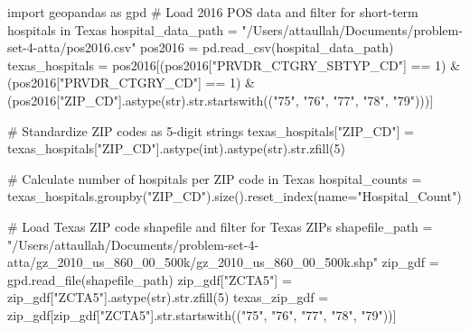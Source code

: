 \documentclass[
  letterpaper,
  DIV=11,
  numbers=noendperiod]{scrartcl}
\newenvironment{Shaded}{\begin{snugshade}}{\end{snugshade}}
\newcommand{\BuiltInTok}[1]{\textcolor[rgb]{0.00,0.23,0.31}{#1}}
\newcommand{\CommentTok}[1]{\textcolor[rgb]{0.37,0.37,0.37}{#1}}
\newcommand{\DecValTok}[1]{\textcolor[rgb]{0.68,0.00,0.00}{#1}}
\newcommand{\ImportTok}[1]{\textcolor[rgb]{0.00,0.46,0.62}{#1}}
\newcommand{\NormalTok}[1]{\textcolor[rgb]{0.00,0.23,0.31}{#1}}
\newcommand{\OperatorTok}[1]{\textcolor[rgb]{0.37,0.37,0.37}{#1}}
\newcommand{\StringTok}[1]{\textcolor[rgb]{0.13,0.47,0.30}{#1}}
\begin{document}
\begin{Shaded}
\begin{Highlighting}[]
\ImportTok{import}\NormalTok{ geopandas }\ImportTok{as}\NormalTok{ gpd}
\CommentTok{\# Load 2016 POS data and filter for short{-}term hospitals in Texas}
\NormalTok{hospital\_data\_path }\OperatorTok{=} \StringTok{"/Users/attaullah/Documents/problem{-}set{-}4{-}atta/pos2016.csv"}
\NormalTok{pos2016 }\OperatorTok{=}\NormalTok{ pd.read\_csv(hospital\_data\_path)}
\NormalTok{texas\_hospitals }\OperatorTok{=}\NormalTok{ pos2016[(pos2016[}\StringTok{"PRVDR\_CTGRY\_SBTYP\_CD"}\NormalTok{] }\OperatorTok{==} \DecValTok{1}\NormalTok{) }\OperatorTok{\&}
\NormalTok{                          (pos2016[}\StringTok{"PRVDR\_CTGRY\_CD"}\NormalTok{] }\OperatorTok{==} \DecValTok{1}\NormalTok{) }\OperatorTok{\&}
\NormalTok{                          (pos2016[}\StringTok{"ZIP\_CD"}\NormalTok{].astype(}\BuiltInTok{str}\NormalTok{).}\BuiltInTok{str}\NormalTok{.startswith((}\StringTok{"75"}\NormalTok{, }\StringTok{"76"}\NormalTok{, }\StringTok{"77"}\NormalTok{, }\StringTok{"78"}\NormalTok{, }\StringTok{"79"}\NormalTok{)))]}

\CommentTok{\# Standardize ZIP codes as 5{-}digit strings}
\NormalTok{texas\_hospitals[}\StringTok{"ZIP\_CD"}\NormalTok{] }\OperatorTok{=}\NormalTok{ texas\_hospitals[}\StringTok{"ZIP\_CD"}\NormalTok{].astype(}\BuiltInTok{int}\NormalTok{).astype(}\BuiltInTok{str}\NormalTok{).}\BuiltInTok{str}\NormalTok{.zfill(}\DecValTok{5}\NormalTok{)}

\CommentTok{\# Calculate number of hospitals per ZIP code in Texas}
\NormalTok{hospital\_counts }\OperatorTok{=}\NormalTok{ texas\_hospitals.groupby(}\StringTok{"ZIP\_CD"}\NormalTok{).size().reset\_index(name}\OperatorTok{=}\StringTok{"Hospital\_Count"}\NormalTok{)}

\CommentTok{\# Load Texas ZIP code shapefile and filter for Texas ZIPs}
\NormalTok{shapefile\_path }\OperatorTok{=} \StringTok{"/Users/attaullah/Documents/problem{-}set{-}4{-}atta/gz\_2010\_us\_860\_00\_500k/gz\_2010\_us\_860\_00\_500k.shp"}
\NormalTok{zip\_gdf }\OperatorTok{=}\NormalTok{ gpd.read\_file(shapefile\_path)}
\NormalTok{zip\_gdf[}\StringTok{"ZCTA5"}\NormalTok{] }\OperatorTok{=}\NormalTok{ zip\_gdf[}\StringTok{"ZCTA5"}\NormalTok{].astype(}\BuiltInTok{str}\NormalTok{).}\BuiltInTok{str}\NormalTok{.zfill(}\DecValTok{5}\NormalTok{)}
\NormalTok{texas\_zip\_gdf }\OperatorTok{=}\NormalTok{ zip\_gdf[zip\_gdf[}\StringTok{"ZCTA5"}\NormalTok{].}\BuiltInTok{str}\NormalTok{.startswith((}\StringTok{"75"}\NormalTok{, }\StringTok{"76"}\NormalTok{, }\StringTok{"77"}\NormalTok{, }\StringTok{"78"}\NormalTok{, }\StringTok{"79"}\NormalTok{))]}


\end{Highlighting}
\end{Shaded}
\end{document}

